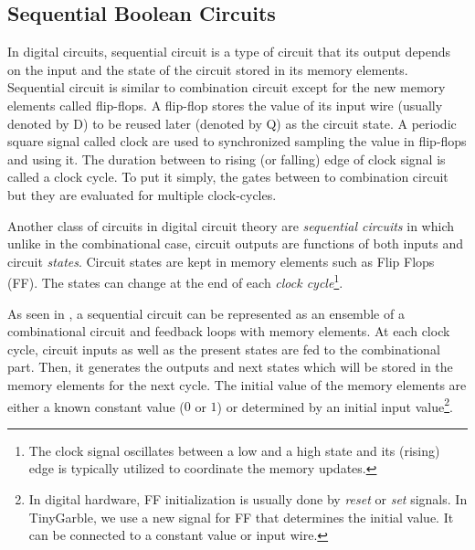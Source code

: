 \subsection{Sequential Boolean Circuits}
In digital circuits, sequential circuit is a type of circuit that its output depends on the input and the state of the circuit stored in its memory elements.
Sequential circuit is similar to combination circuit except for the new memory elements called flip-flops.
A flip-flop stores the value of its input wire (usually denoted by D) to be reused later (denoted by Q) as the circuit state.
A periodic square signal called clock are used to synchronized sampling the value in flip-flops and using it.
The duration between to rising (or falling) edge of clock signal is called a clock cycle.
To put it simply, the gates between to combination circuit but they are evaluated for multiple clock-cycles.


Another class of circuits in digital circuit theory are \emph{sequential circuits} in which unlike in the combinational case, circuit outputs are functions of both inputs and circuit \emph{states}.
Circuit states are kept in memory elements such as Flip Flops (FF).
The states can change at the end of each \emph{clock cycle}\footnote{The clock signal oscillates between a low and a high state and its (rising) edge is typically utilized to coordinate the memory updates.}.

As seen in , a sequential circuit can be represented as an ensemble of a combinational circuit and feedback loops with memory elements.
At each clock cycle, circuit inputs as well as the present states are fed to the combinational part.
Then, it generates the outputs and next states which will be stored in the memory elements for the next cycle.
The initial value of the memory elements are either a known constant value ($0$ or $1$) or determined by an initial input value\footnote{In digital hardware, FF initialization is usually done by \emph{reset} or \emph{set} signals. In TinyGarble, we use a new signal for FF that determines the initial value. It can be connected to a constant value or input wire.}.
